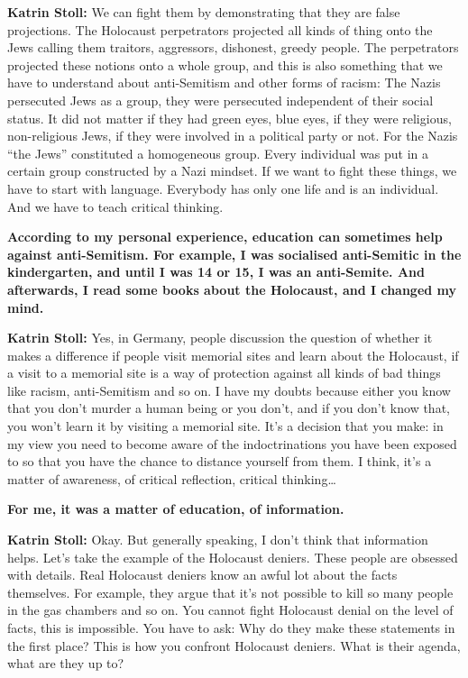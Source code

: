 \textbf{Katrin Stoll:} We can fight them by demonstrating that they are false projections. The Holocaust perpetrators projected all kinds of thing onto the Jews calling them traitors, aggressors, dishonest, greedy people. The perpetrators projected these notions onto a whole group, and this is also something that we have to understand about anti-Semitism and other forms of racism: The Nazis persecuted Jews as a group, they were persecuted independent of their social status. It did not matter if they had green eyes, blue eyes, if they were religious, non-religious Jews, if they were involved in a political party or not. For the Nazis "`the Jews"' constituted a homogeneous group. Every individual was put in a certain group constructed by a Nazi mindset. If we want to fight these things, we have to start with language. Everybody has only one life and is an individual. And we have to teach critical thinking.   

\textbf{According to my personal experience, education can sometimes help against anti-Semitism. For example, I was socialised anti-Semitic in the kindergarten, and until I was 14 or 15, I was an anti-Semite. And afterwards, I read some books about the Holocaust, and I changed my mind.}

\textbf{Katrin Stoll:} Yes, in Germany, people discussion the question of whether it makes a difference if people visit memorial sites and learn about the Holocaust, if a visit to a memorial site is a way of protection against all kinds of bad things like racism, anti-Semitism and so on. I have my doubts because either you know that you don’t murder a human being or you don’t, and if you don’t know that, you won’t learn it by visiting a memorial site. It’s a decision that you make: in my view you need to become aware of the indoctrinations you have been exposed to so that you have the chance to distance yourself from them. I think, it’s a matter of awareness, of critical reflection, critical thinking… 

\textbf{For me, it was a matter of education, of information.} 

\textbf{Katrin Stoll:} Okay. But generally speaking, I don’t think that information helps. Let’s take the example of the Holocaust deniers.  These people are obsessed with details. Real Holocaust deniers know an awful lot about the facts themselves. For example, they argue that it’s not possible to kill so many people in the gas chambers and so on. You cannot fight Holocaust denial on the level of facts, this is impossible. You have to ask: Why do they make these statements in the first place? This is how you confront Holocaust deniers. What is their agenda, what are they up to? 

